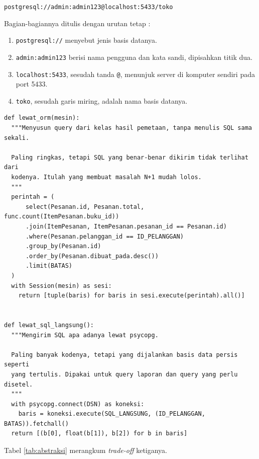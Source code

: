 \begin{center}
  \texttt{postgresql://admin:admin123@localhost:5433/toko}
\end{center}

Bagian-bagiannya ditulis dengan urutan tetap \cite{pgdoc-connection-uri}:

\begin{enumerate}
  \item \texttt{postgresql://} menyebut jenis basis datanya.
  \item \texttt{admin:admin123} berisi nama pengguna dan kata sandi, dipisahkan
        titik dua.
  \item \texttt{localhost:5433}, sesudah tanda \texttt{@}, menunjuk server di
        komputer sendiri pada port 5433.
  \item \texttt{toko}, sesudah garis miring, adalah nama basis datanya.
\end{enumerate}

\begin{lstlisting}[style=PythonStyle, caption={Satu kebutuhan ditulis dalam tiga tingkat abstraksi, tersedia di \berkas{sources/chapter03/tiga-lapis-akses.py}}, label={lst:tiga-lapis}]
def lewat_orm(mesin):
  """Menyusun query dari kelas hasil pemetaan, tanpa menulis SQL sama sekali.

  Paling ringkas, tetapi SQL yang benar-benar dikirim tidak terlihat dari
  kodenya. Itulah yang membuat masalah N+1 mudah lolos.
  """
  perintah = (
      select(Pesanan.id, Pesanan.total, func.count(ItemPesanan.buku_id))
      .join(ItemPesanan, ItemPesanan.pesanan_id == Pesanan.id)
      .where(Pesanan.pelanggan_id == ID_PELANGGAN)
      .group_by(Pesanan.id)
      .order_by(Pesanan.dibuat_pada.desc())
      .limit(BATAS)
  )
  with Session(mesin) as sesi:
    return [tuple(baris) for baris in sesi.execute(perintah).all()]


def lewat_sql_langsung():
  """Mengirim SQL apa adanya lewat psycopg.

  Paling banyak kodenya, tetapi yang dijalankan basis data persis seperti
  yang tertulis. Dipakai untuk query laporan dan query yang perlu disetel.
  """
  with psycopg.connect(DSN) as koneksi:
    baris = koneksi.execute(SQL_LANGSUNG, (ID_PELANGGAN, BATAS)).fetchall()
  return [(b[0], float(b[1]), b[2]) for b in baris]

\end{lstlisting}

Tabel \ref{tab:abstraksi} merangkum \textit{trade-off} ketiganya.

